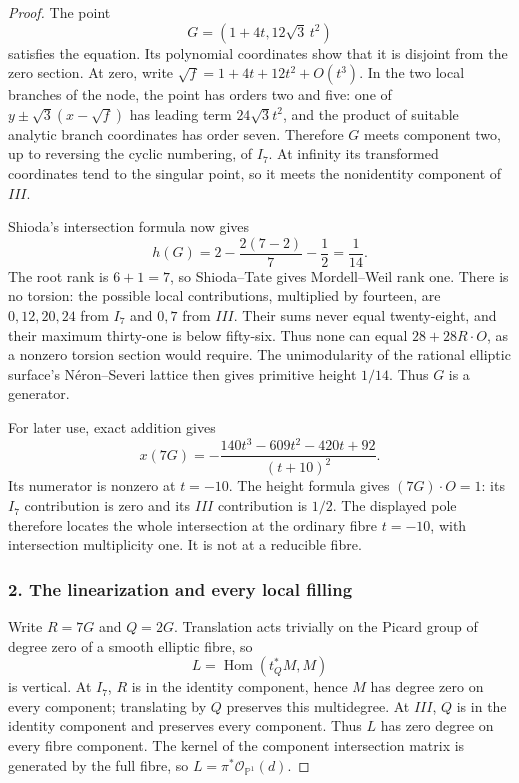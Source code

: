 \begin{proof}
The point \[
 G=(1+4t,12\sqrt3\,t^2)
\] satisfies the equation. Its polynomial coordinates show that it is disjoint from the zero section. At zero, write \(\sqrt f=1+4t+12t^2+O(t^3)\). In the two local branches of the node, the point has orders two and five: one of \(y\pm\sqrt3(x-\sqrt f)\) has leading term \(24\sqrt3t^2\), and the product of suitable analytic branch coordinates has order seven. Therefore \(G\) meets component two, up to reversing the cyclic numbering, of \(I_7\). At infinity its transformed coordinates tend to the singular point, so it meets the nonidentity component of \(III\).

Shioda's intersection formula now gives \[
 h(G)=2-\frac{2(7-2)}7-\frac12=\frac1{14}.
\] The root rank is \(6+1=7\), so Shioda--Tate gives Mordell--Weil rank one. There is no torsion: the possible local contributions, multiplied by fourteen, are \(0,12,20,24\) from \(I_7\) and \(0,7\) from \(III\). Their sums never equal twenty-eight, and their maximum thirty-one is below fifty-six. Thus none can equal \(28+28R\cdot O\), as a nonzero torsion section would require. The unimodularity of the rational elliptic surface's Néron--Severi lattice then gives primitive height \(1/14\). Thus \(G\) is a generator.

For later use, exact addition gives \[
 x(7G)=-\frac{140t^3-609t^2-420t+92}{(t+10)^2}.
\] Its numerator is nonzero at \(t=-10\). The height formula gives \((7G)\cdot O=1\): its \(I_7\) contribution is zero and its \(III\) contribution is \(1/2\). The displayed pole therefore locates the whole intersection at the ordinary fibre \(t=-10\), with intersection multiplicity one. It is not at a reducible fibre.

\subsubsection{2. The linearization and every local filling}\label{the-linearization-and-every-local-filling}

Write \(R=7G\) and \(Q=2G\). Translation acts trivially on the Picard group of degree zero of a smooth elliptic fibre, so \[
 L=\operatorname{Hom}(t_Q^*M,M)
\] is vertical. At \(I_7\), \(R\) is in the identity component, hence \(M\) has degree zero on every component; translating by \(Q\) preserves this multidegree. At \(III\), \(Q\) is in the identity component and preserves every component. Thus \(L\) has zero degree on every fibre component. The kernel of the component intersection matrix is generated by the full fibre, so \(L=\pi^*\mathcal O_{\mathbb P^1}(d)\).


\end{proof}

